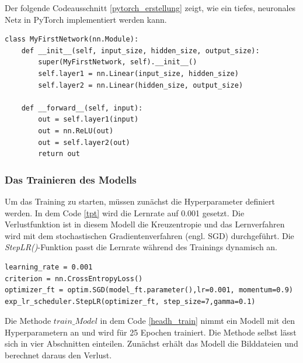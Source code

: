 Der folgende Codeausschnitt \ref{pytorch_erstellung} zeigt, wie ein tiefes, neuronales Netz in PyTorch implementiert werden kann.

\begin{lstlisting}[caption={Veranschaulichung der typischen Klassenstruktur eines neuronalen Netzes\cite{Subramanian2018}.}, label=pytorch_erstellung]
class MyFirstNetwork(nn.Module):
	def __init__(self, input_size, hidden_size, output_size):
		super(MyFirstNetwork, self).__init__()
		self.layer1 = nn.Linear(input_size, hidden_size)
		self.layer2 = nn.Linear(hidden_size, output_size)
		
	def __forward__(self, input):
		out = self.layer1(input)
		out = nn.ReLU(out)
		out = self.layer2(out)
		return out
\end{lstlisting}

\subsubsection{Das Trainieren des Modells}

Um das Training zu starten, müssen zunächst die Hyperparameter definiert werden. In dem Code \ref{tpt} wird die Lernrate auf 0.001 gesetzt. Die Verlustfunktion ist in diesem Modell die Kreuzentropie und das Lernverfahren wird mit dem stochastischen Gradientenverfahren (engl. SGD) durchgeführt. Die \textit{StepLR()}-Funktion passt die Lernrate während des Trainings dynamisch an.  

\begin{lstlisting}[caption={Definition der Hyperparameter, die in der Training-Methode benötigt werden\cite{Subramanian2018}.}, label=tpt]
learning_rate = 0.001
criterion = nn.CrossEntropyLoss()
optimizer_ft = optim.SGD(model_ft.parameter(),lr=0.001, momentum=0.9)
exp_lr_scheduler.StepLR(optimizer_ft, step_size=7,gamma=0.1)
\end{lstlisting}

Die Methode \textit{$train\_Model$} in dem Code \ref{headh_train} nimmt ein Modell mit den Hyperparametern an und wird für 25 Epochen trainiert. Die Methode selbst lässt sich in vier Abschnitten einteilen. Zunächst erhält das Modell die Bilddateien und berechnet daraus den Verlust.

